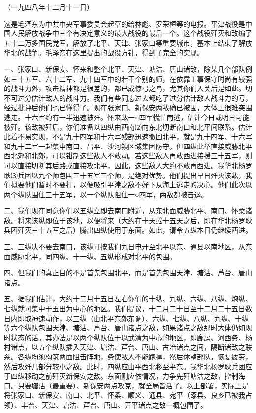 \documentclass[UTF-8, a5paper, 12pt]{ctexart}
\begin{document}
（一九四八年十二月十一日）

这是毛泽东为中共中央军事委员会起草的给林彪、罗荣桓等的电报。平津战役是中国人民解放战争中三个有决定意义的最大战役的最后一个。这个战役歼灭和改编了五十二万多国民党军，解放了北平、天津、张家口等重要城市，基本上结束了解放华北的战争。毛泽东在这里提出的战役方针，得到了完全的实现。

一、张家口、新保安、怀来和整个北平、天津、塘沽、唐山诸敌，除某几个部队例如三十五军、六十二军、九十四军中的若干个别的师，在依靠工事保守时尚有较强的战斗力外，攻击精神都是很差的，都已成惊弓之鸟，尤其你们入关后是如此。切不可过分估计敌人的战斗力。我们有些同志过去都吃了过分估计敌人战斗力的亏，经过批评后他们也已懂得了。现在张家口、新保安两敌确已被围，大体上很难突围逃走。十六军约有一半迅速被歼。怀来敌一○四军慌忙南逃，估计今日或明日可能被歼。该敌被歼后，你们准备以四纵由西南⑵向东北切断南口和北平间联系。估计此着不易实现，不是九十四军和十六军残部迅速撤回北平，就是九十四军、十六军和九十二军一起集中南口、昌平、沙河镇区域集团防守。但四纵此举直接威胁北平西北郊和北郊，可以钳制这些敌人不敢动。若这些敌人再敢西进接援三十五军，则可以直接切断其后路或直接攻北平，因此，这些敌人大约不敢再西进。我华北杨罗耿⑶兵团以九个师包围三十五军三个师，是绝对优势。他们提出早日歼灭该敌，我们拟要他们暂时不要打，以便吸引平津之敌不好下从海上逃走的决心。他们此次以两个纵队围住三十五军，以一个纵队阻住一○四军，两敌都被击退。

二、我们现在同意你们以五纵立即去南口附近，从东北面威胁北平、南口、怀柔诸敌。将来该纵即位于该地，以便将来（大约在十天或十五天之后，即在华北杨罗耿兵团歼灭三十五军之后）腾出四纵使用于东面。如此，请令五纵本日仍继续西进。

三、三纵决不要去南口，该纵可按我们九日电开至北平以东、通县以南地区，从东面威胁北平，同四纵、十一纵、五纵形成对北平的包围。

四、但我们的真正目的不是首先包围北平，而是首先包围天津、塘沽、芦台、唐山诸点。

五、据我们估计，大约十二月十五日左右你们的十纵、九纵、六纵、八纵、炮纵、七纵就可集中于玉田为中心的地区。我们提议，十二月二十日至十二月二十五日数日内即取神速动作，以三纵（由北平东郊东调）、六纵、七纵、八纵、九纵、十纵等六个纵队包围天津、塘沽、芦台、唐山诸点之敌，如果诸点之敌那时大体仍如现时状态的话。其办法是以两个纵队位于以武清为中心的地区，即廊房、河西务、杨村诸点，以五个纵队插入天津、塘沽、芦台、唐山、古冶诸点之间，隔断诸敌之联系。各纵均须构筑两面阻击阵地，务使敌人不能跑掉，然后休整部队，恢复疲劳，然后攻歼几部分较小之敌。此时，四纵应由平西北移至平东。我华北杨罗耿兵团应于四纵移动之前歼灭新保安之敌。东面则应依情况，力争先歼塘沽之敌，控制海口。只要塘沽（最重要）、新保安两点攻克，就全局皆活了。以上部署，实际上是将张家口、新保安、南口、北平、怀柔、顺义、通县、宛平（涿县、良乡已被我占领）、丰台、天津、塘沽、芦台、唐山、开平诸点之敌一概包围了。
\end{document}
